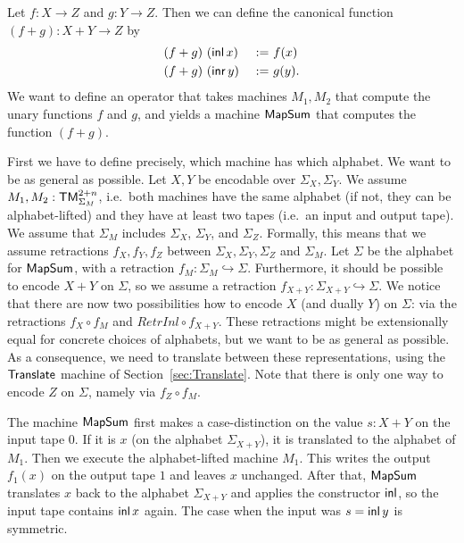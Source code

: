Let $f : X \to Z$ and $g : Y \to Z$.  Then we can define the canonical function $(f+g) : X+Y \to Z$ by
\begin{alignat*}{2}
  (f+g)&~(\operatorname{\mathsf{inl}} x)&~:=~& f(x) \\
  (f+g)&~(\operatorname{\mathsf{inr}} y)&~:=~& g(y).
\end{alignat*}
We want to define an operator that takes machines $M_1, M_2$ that compute the unary functions $f$ and $g$, and yields a machine $\mathsf{MapSum}$ that
computes the function $(f+g)$.

First we have to define precisely, which machine has which alphabet.  We want to be as general as possible.  Let $X, Y$ be encodable over
$\Sigma_X, \Sigma_Y$.  We assume $M_1, M_2 : \mathsf{TM}_{\Sigma_M}^{2+n}$, i.e.\ both machines have the same alphabet (if not, they can be alphabet-lifted)
and they have at least two tapes (i.e.\ an input and output tape).  We assume that $\Sigma_M$ includes $\Sigma_X$, $\Sigma_Y$, and $\Sigma_Z$.
Formally, this means that we assume retractions $f_X,f_Y,f_Z$ between $\Sigma_X, \Sigma_Y, \Sigma_Z$ and $\Sigma_M$.  Let $\Sigma$ be the alphabet for
$\mathsf{MapSum}$, with a retraction $f_M : \Sigma_M \hookrightarrow \Sigma$.  Furthermore, it should be possible to encode $X+Y$ on $\Sigma$, so we
assume a retraction $f_{X+Y} : \Sigma_{X+Y} \hookrightarrow \Sigma$.  We notice that there are now two possibilities how to encode $X$ (and dually
$Y$) on $\Sigma$: via the retractions $f_X \circ f_M$ and $RetrInl \circ f_{X+Y}$.  These retractions might be extensionally equal for concrete
choices of alphabets, but we want to be as general as possible.  As a consequence, we need to translate between these representations, using the
$\mathsf{Translate}$ machine of Section~\ref{sec:Translate}.  Note that there is only one way to encode $Z$ on $\Sigma$, namely via $f_Z \circ f_M$.

The machine $\mathsf{MapSum}$ first makes a case-distinction on the value $s:X+Y$ on the input tape $0$.  If it is $x$ (on the alphabet $\Sigma_{X+Y}$),
it is translated to the alphabet of $M_1$.  Then we execute the alphabet-lifted machine $M_1$.  This writes the output $f_1(x)$ on the output tape $1$
and leaves $x$ unchanged.  After that, $\mathsf{MapSum}$ translates $x$ back to the alphabet $\Sigma_{X+Y}$ and applies the constructor $\operatorname{\mathsf{inl}}$, so the
input tape contains $\operatorname{\mathsf{inl}} x$ again.  The case when the input was $s=\operatorname{\mathsf{inl}} y$ is symmetric.

